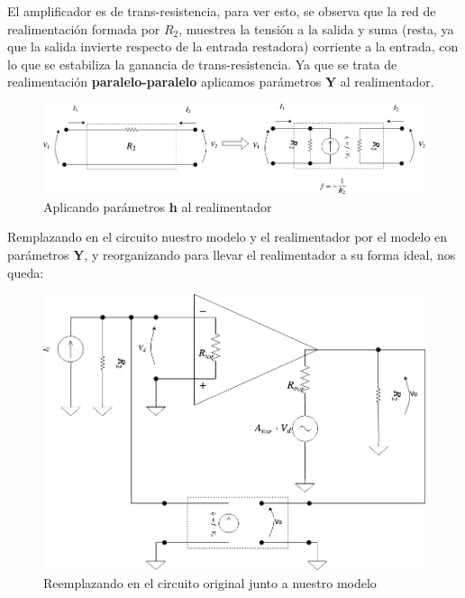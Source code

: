 El amplificador es de trans-resistencia, para ver esto, se observa que la red de realimentación formada por $R_{2}$, muestrea la tensión a la salida y suma (resta, ya que la salida invierte respecto de la entrada restadora) corriente a la entrada, con lo que se estabiliza la ganancia de trans-resistencia. Ya que se trata de realimentación \textbf{paralelo-paralelo} aplicamos parámetros \textbf{Y} al realimentador.


\begin{figure}[H] %
\begin{center}
\includegraphics[width=0.9 \textwidth, angle=0]{./img/operacionales/OP_INV_FEEDBACK.png}
\caption{\label{fig:fig_operational_ideal_inverter_tr_feedback}\footnotesize{Aplicando parámetros \textbf{h} al realimentador}}
\end{center}
\end{figure}



Remplazando en el circuito nuestro modelo y el realimentador por el modelo en parámetros \textbf{Y}, y reorganizando para llevar el realimentador a su forma ideal, nos queda:


\begin{figure}[H] %
\begin{center}
\includegraphics[width=0.9 \textwidth, angle=0]{./img/operacionales/OP_NONIDEAL_MODEL_INV_FEEDBACK_PARAMETERS.png}
\caption{\label{fig:fig_nideal_inv_feedback_pars}\footnotesize{Reemplazando en el circuito original junto a nuestro modelo}}
\end{center}
\end{figure}

